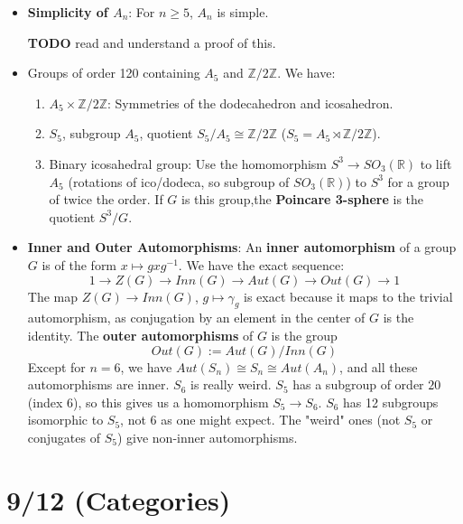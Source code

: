 \documentclass[11pt, oneside]{amsart}   	%
\theoremstyle{definition}
\begin{document}
\begin{itemize}
	\item \textbf{Simplicity of $A_n$}: For $n \geq 5$, $A_n$ is simple.
	
	\textbf{TODO} read and understand a proof of this.
	
	\item Groups of order 120 containing $A_5$ and $\mathbb Z/2\mathbb Z$. We have:
	
		\begin{enumerate}
		
			\item $A_5\times \mathbb Z/2\mathbb Z$: Symmetries of the dodecahedron and icosahedron.
			
			\item $S_5$, subgroup $A_5$, quotient $S_5/A_5\cong\mathbb Z/2\mathbb Z$ ($S_5 = A_5\rtimes \mathbb Z/2\mathbb Z$).
		
			\item Binary icosahedral group: Use the homomorphism $S^3\rightarrow SO_3(\mathbb R)$ to lift $A_5$ (rotations of ico/dodeca, 
			so subgroup of $SO_3(\mathbb R)$) to $S^3$ for a group of twice the order. If $G$ is this group,the \textbf{Poincare 3-sphere} is the 
			quotient $S^3/G$.
		
		\end{enumerate}

	\item \textbf{Inner and Outer Automorphisms}: An \textbf{inner automorphism} of a group $G$ is of the form $x\mapsto gxg^{-1}$. We have the 
	exact sequence:
	$$
		1\rightarrow Z(G)\rightarrow Inn(G)\rightarrow Aut(G)\rightarrow Out(G)\rightarrow 1
	$$
	The map $Z(G)\rightarrow Inn(G)$, $g\mapsto\gamma_g$ is exact because it maps to the trivial automorphism, as conjugation by an element in 
	the center of $G$ is the identity. The \textbf{outer automorphisms} of $G$ is the group 
	$$
		Out(G) := Aut(G) / Inn(G)
	$$
	Except for $n = 6$, we have $Aut(S_n) \cong S_n \cong Aut(A_n)$, and all these automorphisms are inner. $S_6$ is really weird. $S_5$ has 
	a subgroup of order $20$ (index 6), so this gives us a homomorphism $S_5\rightarrow S_6$. $S_6$ has 12 subgroups isomorphic to $S_5$, 
	not 6 as one might expect. The "weird" ones (not $S_5$ or conjugates of $S_5$) give non-inner automorphisms.

\end{itemize}
	
\section{9/12 (Categories)}
	
\end{document}
